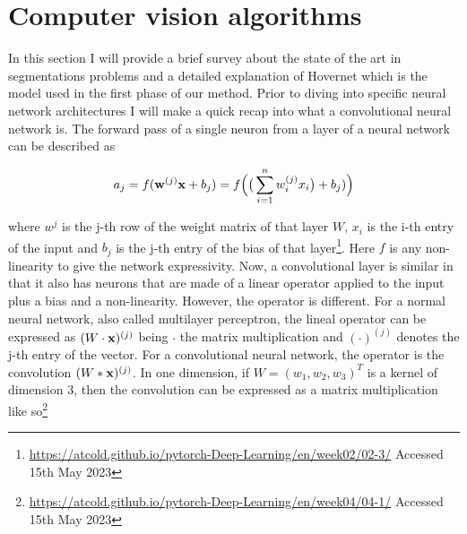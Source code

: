 \section{Computer vision algorithms}\label{sec:vision}

In this section I will provide a brief survey about the state of the art in segmentations problems and a detailed explanation of Hovernet \cite{hovernet} which is the model used in the first phase of our method. Prior to diving into specific neural network architectures I will make a quick recap into what a convolutional neural network is. The forward pass of a single neuron from a layer of a neural network can be described as

\begin{equation}
    a_j = f({\mathbf w}^{(j)} {\mathbf x} + b_j) = f\Big( \big(\sum_{i=1}^n w_i^{(j)} x_i\big) +b_j ) \Big)
\end{equation}

\noindent where $w^{j}$ is the j-th row of the weight matrix of that layer $W$, $x_i$ is the i-th entry of the input and $b_j$ is the j-th entry of the bias of that layer\footnote{\url{https://atcold.github.io/pytorch-Deep-Learning/en/week02/02-3/} Accessed 15th May 2023}. Here $f$ is any non-linearity to give the network expressivity. Now, a convolutional layer is similar in that it also has neurons that are made of a linear operator applied to the input plus a bias and a non-linearity. However, the operator is different. For a normal neural network, also called multilayer perceptron, the lineal operator can be expressed as $(W \cdot {\mathbf x})^{(j)}$ being $\cdot$ the matrix multiplication and $(\cdot)^{(j)}$ denotes the j-th entry of the vector. For a convolutional neural network, the operator is the convolution $(W * {\mathbf x})^{(j)}$. In one dimension, if $W = (w_1, w_2, w_3)^T$ is a kernel of dimension 3, then the convolution can be expressed as a matrix multiplication like so\footnote{\url{https://atcold.github.io/pytorch-Deep-Learning/en/week04/04-1/} Accessed 15th May 2023}

